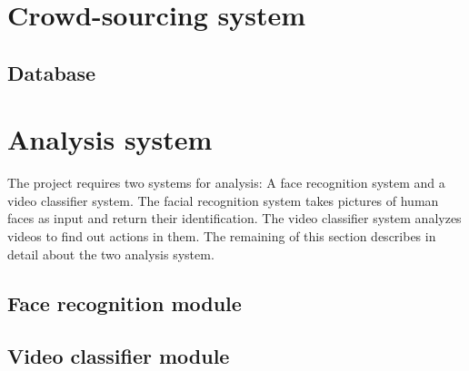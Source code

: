 \section{Crowd-sourcing system}
\subsection{Database}
\section{Analysis system}
The project requires two systems for analysis: A face recognition system and a video classifier system. The facial recognition system takes pictures of human faces as input and return their identification. The video classifier system analyzes videos to find out actions in them. The remaining of this section describes in detail about the two analysis system.
\subsection{Face recognition module}
\subsection{Video classifier module}
